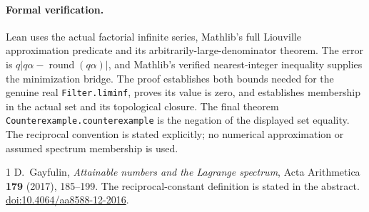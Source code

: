 \documentclass[11pt]{article}
\begin{document}
\paragraph{Formal verification.}
Lean uses the actual factorial infinite series, Mathlib's full Liouville approximation predicate and its arbitrarily-large-denominator theorem. The error is $q|q\alpha-\operatorname{round}(q\alpha)|$, and Mathlib's verified nearest-integer inequality supplies the minimization bridge. The proof establishes both bounds needed for the genuine real \texttt{Filter.liminf}, proves its value is zero, and establishes membership in the actual set and its topological closure. The final theorem \texttt{Counterexample.counterexample} is the negation of the displayed set equality. The reciprocal convention is stated explicitly; no numerical approximation or assumed spectrum membership is used.

\begin{thebibliography}{1}
 D.~Gayfulin, \emph{Attainable numbers and the Lagrange spectrum}, Acta Arithmetica \textbf{179} (2017), 185--199. The reciprocal-constant definition is stated in the abstract. \href{https://doi.org/10.4064/aa8588-12-2016}{doi:10.4064/aa8588-12-2016}.
\end{thebibliography}
\end{document}
